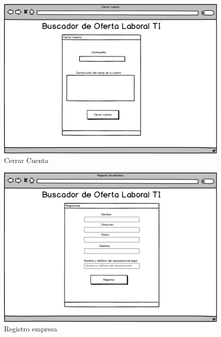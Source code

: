 \begin{figure}[h]
\begin{center}
	\includegraphics[scale=0.55]{./resources/09cerrarcuenta.png}
	\caption{Cerrar Cuenta}
	\label{fig:ccuenta}
\end{center}
\end{figure}
\begin{figure}[h]
\begin{center}
	\includegraphics[scale=0.55]{./resources/12registroem.png}
	\caption{Registro empresa}
	\label{fig:re}
\end{center}
\end{figure}

